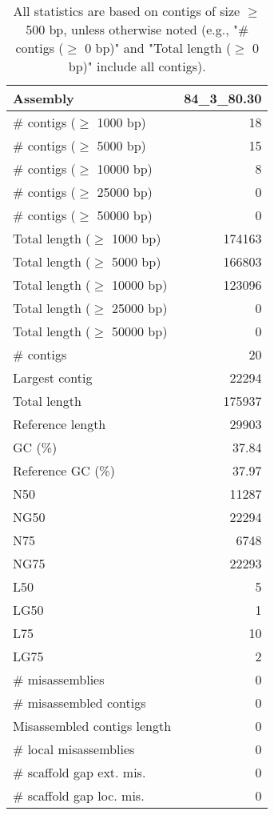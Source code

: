 \documentclass[12pt,a4paper]{article}
\begin{document}
\begin{table}[ht]
\begin{center}
\caption{All statistics are based on contigs of size $\geq$ 500 bp, unless otherwise noted (e.g., "\# contigs ($\geq$ 0 bp)" and "Total length ($\geq$ 0 bp)" include all contigs).}
\begin{tabular}{|l*{1}{|r}|}
\hline
Assembly & 84\_3\_80.30 \\ \hline
\# contigs ($\geq$ 1000 bp) & 18 \\ \hline
\# contigs ($\geq$ 5000 bp) & 15 \\ \hline
\# contigs ($\geq$ 10000 bp) & 8 \\ \hline
\# contigs ($\geq$ 25000 bp) & 0 \\ \hline
\# contigs ($\geq$ 50000 bp) & 0 \\ \hline
Total length ($\geq$ 1000 bp) & 174163 \\ \hline
Total length ($\geq$ 5000 bp) & 166803 \\ \hline
Total length ($\geq$ 10000 bp) & 123096 \\ \hline
Total length ($\geq$ 25000 bp) & 0 \\ \hline
Total length ($\geq$ 50000 bp) & 0 \\ \hline
\# contigs & 20 \\ \hline
Largest contig & 22294 \\ \hline
Total length & 175937 \\ \hline
Reference length & 29903 \\ \hline
GC (\%) & 37.84 \\ \hline
Reference GC (\%) & 37.97 \\ \hline
N50 & 11287 \\ \hline
NG50 & 22294 \\ \hline
N75 & 6748 \\ \hline
NG75 & 22293 \\ \hline
L50 & 5 \\ \hline
LG50 & 1 \\ \hline
L75 & 10 \\ \hline
LG75 & 2 \\ \hline
\# misassemblies & 0 \\ \hline
\# misassembled contigs & 0 \\ \hline
Misassembled contigs length & 0 \\ \hline
\# local misassemblies & 0 \\ \hline
\# scaffold gap ext. mis. & 0 \\ \hline
\# scaffold gap loc. mis. & 0 \\ \hline

\end{tabular}
\end{center}
\end{table}
\end{document}
